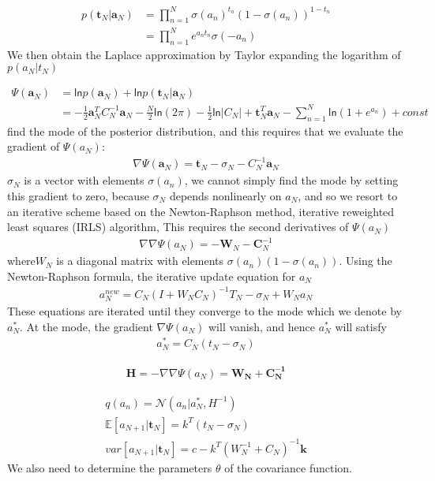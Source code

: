 \documentclass[a4paper]{article}
\begin{document}
\begin{align*}
p(\mathbf{t}_{N}|\mathbf{a}_N) &= \prod_{n=1}^N \sigma(a_n)^{t_n}(1-\sigma(a_n))^{1-t_n}\\
&= \prod_{n=1}^N e^{a_nt_n} \sigma(-a_n)
\end{align*}
We then obtain the Laplace approximation by Taylor expanding the
logarithm of $p(a_N|t_N)$

\begin{align*}
\Psi(\mathbf{a}_N) &= \mathsf{ln} p(\mathbf{a}_N) + \mathsf{ln} p(\mathbf{t}_{N}|\mathbf{a}_N)\\
&=-\frac{1}{2}\mathbf{a}_N^TC_N^{-1}\mathbf{a}_N
  -\frac{N}{2}\mathsf{ln}(2\pi) -\frac{1}{2}\mathsf{ln}|C_N| +
  \mathbf{t}_N^T\mathbf{a}_N - \sum_{n=1}^N \mathsf{ln} (1+e^{a_n}) + const
\end{align*}
find the mode of the posterior distribution, and this requires that we
evaluate the gradient of $\Psi(a_N)$:
\begin{align}
\nabla \Psi(\mathbf{a}_N) = \mathbf{t}_N - \sigma_N - C_N^{-1}\mathbf{a}_N
\end{align}
$\sigma_N$ is a vector with elements $\sigma(a_n)$, we cannot simply find the mode by
setting this gradient to zero, because $\sigma_N$ depends nonlinearly on $a_N$, and so we
resort to an iterative scheme based on the Newton-Raphson method,
iterative reweighted least squares (IRLS) algorithm, This requires the second
derivatives of $\Psi(a_N)$
\begin{align}
  \nabla\nabla \Psi(a_N) = -\mathbf{W}_N - \mathbf{C}_N^{-1}
\end{align}
where$W_N$ is a diagonal matrix with elements $\sigma(a_n)(1−\sigma(a_n))$.
Using the Newton-Raphson formula, the iterative update equation for $a_N$
\begin{align}
a_N^{new} = C_N(I+W_NC_N)^{-1} {T_N -\sigma_N + W_Na_N}
\end{align}
These equations are iterated until they converge to the mode which we
denote by $a_N^*$. At the mode, the gradient $\nabla \Psi(a_N)$ will
vanish, and hence $a_N^*$ will satisfy
\begin{align}
a_N^* = C_N(t_N - \sigma_N)
\end{align}

\begin{align}
\mathbf{H} = - \nabla\nabla\Psi(a_N) = \mathbf{W_N + C_N^{-1}}
\end{align}

\begin{align}
q(a_n) = \mathcal{N}(a_n|a_N^*, H^{-1})\\
\mathbb{E}[a_{N+1}|\mathbf{t}_N] = k^T(t_N - \sigma_N)\\
var[a_{N+1}|\mathbf{t}_N] = c - k^T(W_N^{-1} + C_N)^{-1} \mathbf{k}
\end{align}
We also need to determine the parameters $\theta$ of the covariance function.
\end{document}
